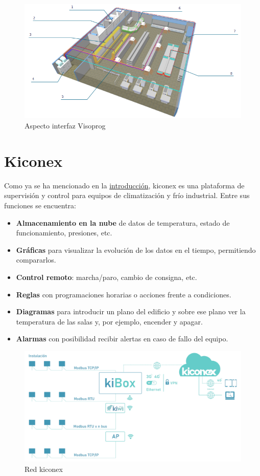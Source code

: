 \begin{figure}[h]
  \centering
  \includegraphics[width=\textwidth, keepaspectratio]{img/planoSupermercado}
  \caption{Aspecto interfaz Visoprog}
  \label{figura:interfazVisoprog}
\end{figure}

\section{Kiconex}
\label{sec:kiconex}

Como ya se ha mencionado en la \hyperref[chap:intro]{introducción}, kiconex es una plataforma de supervisión y control para equipos de climatización y frío industrial. Entre sus funciones se encuentra:
\begin{itemize}
  \item \textbf{Almacenamiento en la nube} de datos de temperatura, estado de funcionamiento, presiones, etc.  
  \item \textbf{Gráficas} para visualizar la evolución de los datos en el tiempo, permitiendo compararlos. 
  \item \textbf{Control remoto}: marcha/paro, cambio de consigna, etc.
  \item \textbf{Reglas} con programaciones horarias o acciones frente a condiciones. 
  \item \textbf{Diagramas} para introducir un plano del edificio y sobre ese plano ver la temperatura de las salas y, por ejemplo, encender y apagar.
  \item \textbf{Alarmas} con posibilidad recibir alertas en caso de fallo del equipo. 
\end{itemize}

\begin{figure}[h]
  \centering
  \includegraphics[width=\textwidth, keepaspectratio]{img/redKiconex}
  \caption{Red kiconex}
  \label{figura:redKiconex}
\end{figure}

